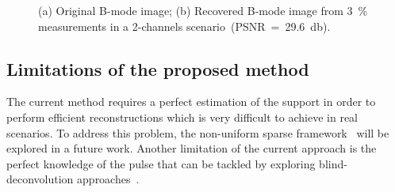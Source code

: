 \documentclass{article}
\theoremstyle{definition}
\begin{document}
\begin{figure}[htb]
	\hfill%
	\hfill%
	\hfill%
	\caption{(a) Original B-mode image; (b) Recovered B-mode image from \SI{3}{\percent} measurements in a \num{2}-channels scenario~(PSNR~=~\SI{29.6}{\decibel}).}
	\label{fig_carotid}
\end{figure}
\subsection{Limitations of the proposed method}
\label{subsec_limitations}
The current method requires a perfect estimation of the support in order to perform efficient reconstructions which is very difficult to achieve in real scenarios. To address this problem, the non-uniform sparse framework~\cite{Khajehnejad_TSP_2011} will be explored in a future work. Another limitation of the current approach is the perfect knowledge of the pulse that can be tackled by exploring blind-deconvolution approaches~\cite{Hedge_TSP_2011, Demirli2001, Zhao_IUS_2016}.
\end{document}
